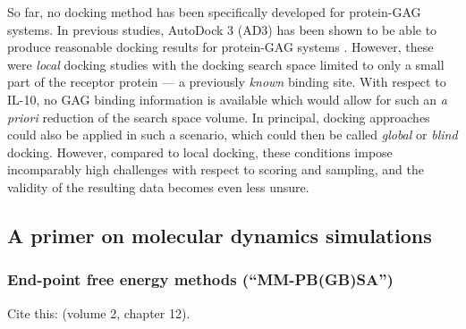 So far, no docking method has been specifically developed for protein-GAG
systems. In previous studies, AutoDock 3 (AD3) \cite{Morris1998} has been shown
to be able to produce reasonable docking results for protein-GAG systems
\cite{japan_docking_ad3_clustering, samsonov_docking_2011}. However, these were
\textit{local} docking studies with the docking search space limited to only a
small part of the receptor protein --- a previously \textit{known} binding site.
With respect to IL-10, no GAG binding information is available which would allow
for such an \textit{a priori} reduction of the search space volume. In
principal, docking approaches could also be applied in such a scenario, which
could then be called \textit{global} or \textit{blind} docking. However,
compared to local docking, these conditions impose incomparably high challenges
with respect to scoring and sampling, and the validity of the resulting data
becomes even less unsure.

\subsection{A primer on molecular dynamics simulations}

\lipsum[1-5]

\subsubsection{End-point free energy methods (\enquote{MM-PB(GB)SA})}
\label{methods:mmpbsa_mmgbsa}


Cite this: \cite{schlick_innovationsdynamics_2012} (volume 2, chapter 12).

\lipsum[1-5]






\lipsum[1-5]





